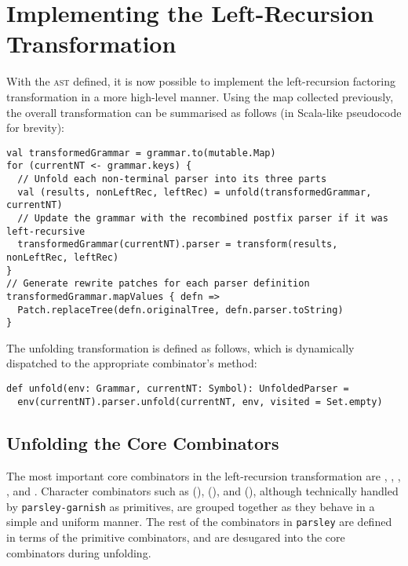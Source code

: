 \documentclass[../../main.tex]{subfiles}
\begin{document}
\section{Implementing the Left-Recursion Transformation}
With the  \textsc{ast} defined, it is now possible to implement the left-recursion factoring transformation in a more high-level manner.
Using the  map collected previously, the overall transformation can be summarised as follows (in Scala-like pseudocode for brevity):
\begin{verbatim}
val transformedGrammar = grammar.to(mutable.Map)
for (currentNT <- grammar.keys) {
  // Unfold each non-terminal parser into its three parts
  val (results, nonLeftRec, leftRec) = unfold(transformedGrammar, currentNT)
  // Update the grammar with the recombined postfix parser if it was left-recursive
  transformedGrammar(currentNT).parser = transform(results, nonLeftRec, leftRec)
}
// Generate rewrite patches for each parser definition
transformedGrammar.mapValues { defn =>
  Patch.replaceTree(defn.originalTree, defn.parser.toString)
}
\end{verbatim}
%
The unfolding transformation is defined as follows, which is dynamically dispatched to the appropriate combinator's  method:
\begin{verbatim}
def unfold(env: Grammar, currentNT: Symbol): UnfoldedParser =
  env(currentNT).parser.unfold(currentNT, env, visited = Set.empty)
\end{verbatim}

\subsection{Unfolding the Core Combinators}
The most important core combinators in the left-recursion transformation are , , , \scala{<|>}, and \scala{<*>}.
Character combinators such as  (),  (), and  (), although technically handled by \texttt{parsley-garnish} as primitives, are grouped together as they behave in a simple and uniform manner.
The rest of the combinators in \texttt{parsley} are defined in terms of the primitive combinators, and are desugared into the core combinators during unfolding.
\end{document}

